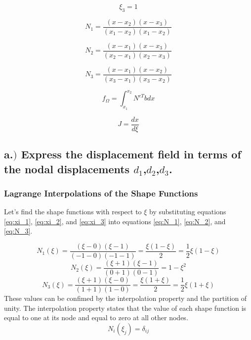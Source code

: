 \documentclass{article}
\begin{document}
\begin{equation}
    \xi_{3} = 1
    \label{eq:xi_3}
\end{equation}

\begin{equation}
    N_1 = \frac{(x - x_2)(x-x_3)}{(x_1 - x_2)(x_1 - x_2)}
    \label{eq:N_1}
\end{equation}

\begin{equation}
    N_2 = \frac{(x - x_1)(x - x_3)}{(x_2 - x_1)(x_2 - x_3)}
    \label{eq:N_2}
\end{equation}

\begin{equation}
    N_3 = \frac{(x - x_1)(x - x_2)}{(x_3 - x_1)(x_3 - x_2)}
    \label{eq:N_3}
\end{equation}

\begin{equation}
    f_{\Omega} = \int_{x_1}^{x_2} N^{eT}b dx
    \label{eq:eforce}
\end{equation}

\begin{equation}
    J = \frac{dx}{d\xi}
    \label{eq:jacobian}
\end{equation}

\subsection*{a.$)$ Express the displacement field in terms of the nodal displacements $d_1$,$d_2$,$d_3$.}

\subsubsection*{Lagrange Interpolations of the Shape Functions}
Let's find the shape functions with respect to $\xi$ by substituting equations \eqref{eq:xi_1}, \eqref{eq:xi_2}, 
and \eqref{eq:xi_3} into equations \eqref{eq:N_1}, \eqref{eq:N_2}, and \eqref{eq:N_3}.

\[
    N_1(\xi) = \frac{(\xi - 0)(\xi - 1)}{(-1 - 0)(-1 - 1)} = \frac{\xi (1 - \xi)}{2} = \frac{1}{2} \xi (1 - \xi)
\]
\[
    N_2(\xi) = \frac{(\xi + 1)(\xi - 1)}{(0 + 1)(0 - 1)} = 1 - \xi^2
\]
\[
    N_3(\xi) = \frac{(\xi + 1)(\xi - 0)}{(1 + 1)(1 - 0)} = \frac{\xi (1 + \xi)}{2} = \frac{1}{2} \xi (1 + \xi)
\]
These values can be confimed by the interpolation property and the partition of unity. The interpolation property states that
the value of each shape function is equal to one at its node and equal to zero at all other nodes.
\begin{equation*}
    N_i(\xi_j) = \delta_{ij}
\end{equation*}
\end{document}
